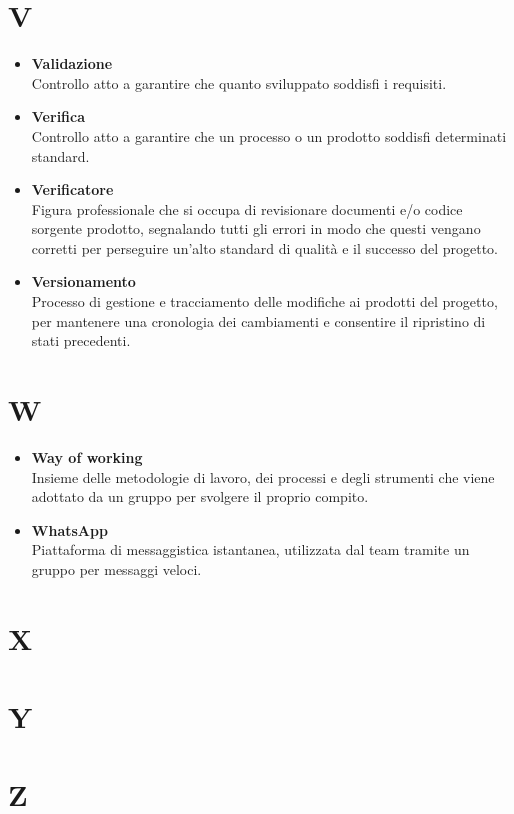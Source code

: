 \documentclass[a4paper,12pt]{article}
\begin{document}
        \section*{V} {
            \begin{itemize}
                \item \textbf{Validazione}\\
                    Controllo atto a garantire che quanto sviluppato soddisfi i requisiti.
                \item \textbf{Verifica}\\
                    Controllo atto a garantire che un processo o un prodotto soddisfi determinati standard.
                \item \textbf{Verificatore}\\
                    Figura professionale che si occupa di revisionare documenti e/o codice sorgente prodotto, segnalando tutti gli errori in modo che questi vengano corretti per perseguire un'alto standard di qualità e il successo del progetto.
                \item \textbf{Versionamento}\\
                    Processo di gestione e tracciamento delle modifiche ai prodotti del progetto, per mantenere una cronologia dei cambiamenti e consentire il ripristino di stati precedenti.
            \end{itemize}
        }
        \newpage

        \section*{W} {
            \begin{itemize}
                \item \textbf{Way of working}\\
                    Insieme delle metodologie di lavoro, dei processi e degli strumenti che viene adottato da un gruppo per svolgere il proprio compito.
                \item \textbf{WhatsApp}\\
                    Piattaforma di messaggistica istantanea, utilizzata dal team tramite un gruppo per messaggi veloci.
            \end{itemize}
        }
        \newpage

        \section*{X} {
            
        }
        \newpage

        \section*{Y} {
            
        }
        \newpage

        \section*{Z} {
            
        }
\end{document}
